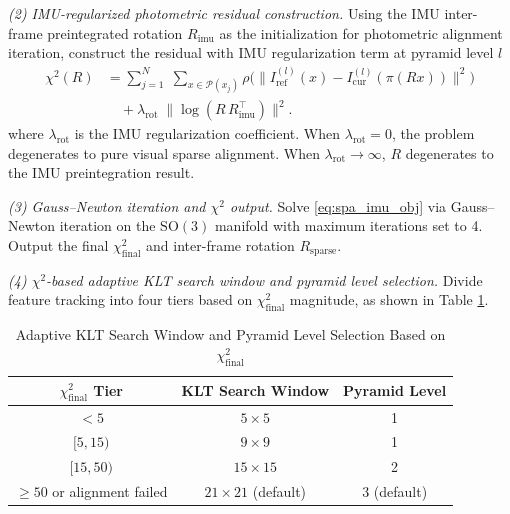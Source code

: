 \documentclass[journal,twoside,web]{ieeecolor}
\begin{document}
\textit{(2) IMU-regularized photometric residual construction.} Using the IMU inter-frame preintegrated rotation $R_{\mathrm{imu}}$ as the initialization for photometric alignment iteration, construct the residual with IMU regularization term at pyramid level $l$
\begin{equation}
\begin{aligned}
\chi^{2}(R) &=
  \sum_{j=1}^{N}\;\sum_{x\in\mathcal{P}(x_{j})}
    \rho\!\Big( \big\|I_{\mathrm{ref}}^{(l)}(x)-I_{\mathrm{cur}}^{(l)}(\pi(Rx))\big\|^{2} \Big) \\[2pt]
  &\quad + \lambda_{\mathrm{rot}}\;\|\log(R\,R_{\mathrm{imu}}^{\!\top})\|^{2} .
\end{aligned}
\label{eq:spa_imu_obj}
\end{equation}
where $\lambda_{\mathrm{rot}}$ is the IMU regularization coefficient. When $\lambda_{\mathrm{rot}}=0$, the problem degenerates to pure visual sparse alignment. When $\lambda_{\mathrm{rot}}\to\infty$, $R$ degenerates to the IMU preintegration result.

\textit{(3) Gauss--Newton iteration and $\chi^{2}$ output.} Solve \eqref{eq:spa_imu_obj} via Gauss--Newton iteration on the $\mathrm{SO}(3)$ manifold with maximum iterations set to 4. Output the final $\chi^{2}_{\mathrm{final}}$ and inter-frame rotation $R_{\mathrm{sparse}}$.

\textit{(4) $\chi^{2}$-based adaptive KLT search window and pyramid level selection.} Divide feature tracking into four tiers based on $\chi^{2}_{\mathrm{final}}$ magnitude, as shown in Table \ref{tab:chi2}.

\begin{table}[!t]
\centering
\caption{Adaptive KLT Search Window and Pyramid Level Selection Based on $\chi^{2}_{\mathrm{final}}$}
\label{tab:chi2}
\begin{tabular}{|c|c|c|}
\hline
$\chi^{2}_{\mathrm{final}}$ Tier & KLT Search Window & Pyramid Level \\
\hline
$< 5$                              & $5\times5$  & 1 \\
\hline
$[5, 15)$                          & $9\times9$  & 1 \\
\hline
$[15, 50)$                         & $15\times15$ & 2 \\
\hline
$\ge 50$ or alignment failed        & $21\times21$ (default) & 3 (default) \\
\hline
\end{tabular}
\end{table}
\end{document}
